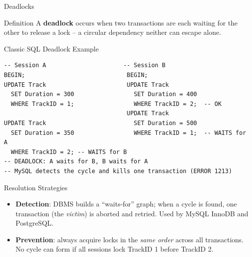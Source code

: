 \begin{frame}[fragile]{Deadlocks}
  \begin{alertblock}{Definition}
    A \textbf{deadlock} occurs when two transactions are each waiting for the
    other to release a lock -- a circular dependency neither can escape alone.
  \end{alertblock}

  \begin{block}{Classic SQL Deadlock Example}
\begin{lstlisting}[style=sqlstyle]
-- Session A                      -- Session B
BEGIN;                             BEGIN;
UPDATE Track                       UPDATE Track
  SET Duration = 300                 SET Duration = 400
  WHERE TrackID = 1;                 WHERE TrackID = 2;  -- OK
                                   UPDATE Track
UPDATE Track                         SET Duration = 500
  SET Duration = 350                 WHERE TrackID = 1;  -- WAITS for A
  WHERE TrackID = 2; -- WAITS for B
-- DEADLOCK: A waits for B, B waits for A
-- MySQL detects the cycle and kills one transaction (ERROR 1213)
\end{lstlisting}
  \end{block}

  \begin{block}{Resolution Strategies}
    \begin{itemize}
      \item \textbf{Detection}: DBMS builds a ``waits-for'' graph; when a
            cycle is found, one transaction (the \emph{victim}) is aborted
            and retried. Used by MySQL InnoDB and PostgreSQL.
      \item \textbf{Prevention}: always acquire locks in the \emph{same
            order} across all transactions. No cycle can form if all
            sessions lock TrackID 1 before TrackID 2.
    \end{itemize}
  \end{block}
\end{frame}
